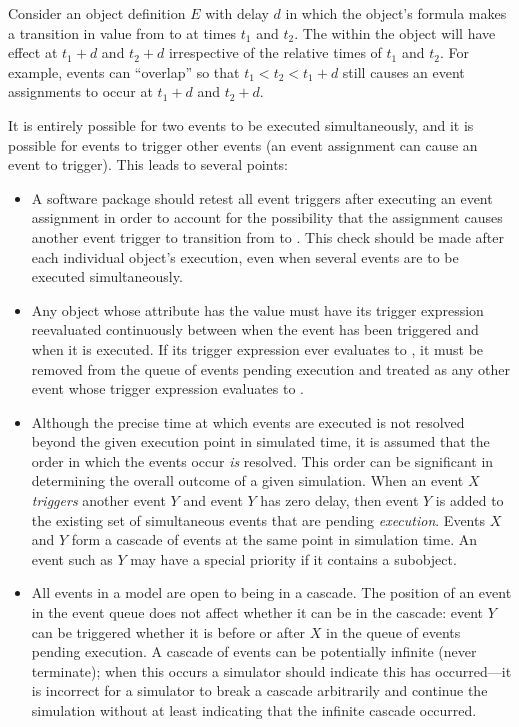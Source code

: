 Consider an \Event object definition $E$ with delay $d$ in which
the \Trigger object's  formula makes a transition in
value from  to  at times $t_1$ and $t_2$.
The \EventAssignment within the \Event object will have effect at
$t_1+d$ and $t_2+d$ irrespective of the relative times of $t_1$
and $t_2$.  For example, events can ``overlap'' so that $t_1 < t_2
< t_1+d$ still causes an event assignments to occur at $t_1+d$ and
$t_2+d$.

It is entirely possible for two events to be executed
simultaneously, and it is possible for events to trigger other events
(\ie an event assignment can cause an event to trigger).  This leads
to several points:
\begin{itemize}

\item A software package should retest all event triggers after
  executing an event assignment in order to account for the
  possibility that the assignment causes another event trigger to
  transition from  to .  This check should be
  made after each individual \Event object's execution, even when
  several events are to be executed simultaneously.  

\item Any \Event object whose \Trigger {}
  attribute has the value  must have its trigger
  expression reevaluated continuously between when the event has
  been triggered and when it is executed.  If its trigger expression
  ever evaluates to , it must be removed from the queue
  of events pending execution and treated as any other event whose
  trigger expression evaluates to .

\item Although the precise time at which events are executed is
  not resolved beyond the given execution point in simulated time,
  it is assumed that the order in which the events occur \emph{is}
  resolved.  This order can be significant in determining the
  overall outcome of a given simulation.  When an event $X$
  \emph{triggers} another event $Y$ and event $Y$ has zero delay,
  then event $Y$ is added to the existing set of simultaneous
  events that are pending \emph{execution}.  Events $X$ and $Y$
  form a cascade of events at the same point in simulation time.
  An event such as $Y$ may have a special priority if it contains
  a \Priority subobject.

\item All events in a model are open to being in a cascade.  The
  position of an event in the event queue does not affect whether
  it can be in the cascade: event $Y$ can be triggered whether it
  is before or after $X$ in the queue of events pending execution.
  A cascade of events can be potentially infinite (never
  terminate); when this occurs a simulator should indicate this
  has occurred---it is incorrect for a simulator to break a
  cascade arbitrarily and continue the simulation without at least
  indicating that the infinite cascade occurred.


\end{itemize}
